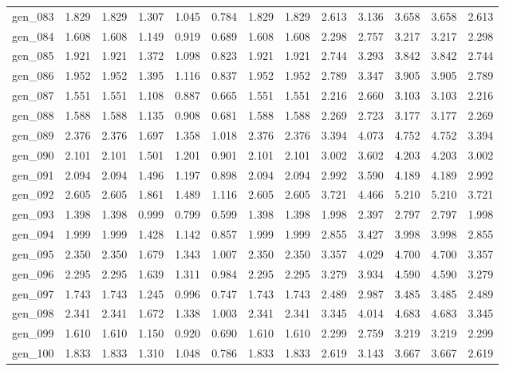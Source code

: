 \begin{tabular}{lrrrrrrrrrrrr}
gen\_083 &  1.829 &  1.829 &  1.307 &  1.045 &  0.784 &  1.829 &  1.829 &  2.613 &  3.136 &  3.658 &  3.658 &  2.613 \\
gen\_084 &  1.608 &  1.608 &  1.149 &  0.919 &  0.689 &  1.608 &  1.608 &  2.298 &  2.757 &  3.217 &  3.217 &  2.298 \\
gen\_085 &  1.921 &  1.921 &  1.372 &  1.098 &  0.823 &  1.921 &  1.921 &  2.744 &  3.293 &  3.842 &  3.842 &  2.744 \\
gen\_086 &  1.952 &  1.952 &  1.395 &  1.116 &  0.837 &  1.952 &  1.952 &  2.789 &  3.347 &  3.905 &  3.905 &  2.789 \\
gen\_087 &  1.551 &  1.551 &  1.108 &  0.887 &  0.665 &  1.551 &  1.551 &  2.216 &  2.660 &  3.103 &  3.103 &  2.216 \\
gen\_088 &  1.588 &  1.588 &  1.135 &  0.908 &  0.681 &  1.588 &  1.588 &  2.269 &  2.723 &  3.177 &  3.177 &  2.269 \\
gen\_089 &  2.376 &  2.376 &  1.697 &  1.358 &  1.018 &  2.376 &  2.376 &  3.394 &  4.073 &  4.752 &  4.752 &  3.394 \\
gen\_090 &  2.101 &  2.101 &  1.501 &  1.201 &  0.901 &  2.101 &  2.101 &  3.002 &  3.602 &  4.203 &  4.203 &  3.002 \\
gen\_091 &  2.094 &  2.094 &  1.496 &  1.197 &  0.898 &  2.094 &  2.094 &  2.992 &  3.590 &  4.189 &  4.189 &  2.992 \\
gen\_092 &  2.605 &  2.605 &  1.861 &  1.489 &  1.116 &  2.605 &  2.605 &  3.721 &  4.466 &  5.210 &  5.210 &  3.721 \\
gen\_093 &  1.398 &  1.398 &  0.999 &  0.799 &  0.599 &  1.398 &  1.398 &  1.998 &  2.397 &  2.797 &  2.797 &  1.998 \\
gen\_094 &  1.999 &  1.999 &  1.428 &  1.142 &  0.857 &  1.999 &  1.999 &  2.855 &  3.427 &  3.998 &  3.998 &  2.855 \\
gen\_095 &  2.350 &  2.350 &  1.679 &  1.343 &  1.007 &  2.350 &  2.350 &  3.357 &  4.029 &  4.700 &  4.700 &  3.357 \\
gen\_096 &  2.295 &  2.295 &  1.639 &  1.311 &  0.984 &  2.295 &  2.295 &  3.279 &  3.934 &  4.590 &  4.590 &  3.279 \\
gen\_097 &  1.743 &  1.743 &  1.245 &  0.996 &  0.747 &  1.743 &  1.743 &  2.489 &  2.987 &  3.485 &  3.485 &  2.489 \\
gen\_098 &  2.341 &  2.341 &  1.672 &  1.338 &  1.003 &  2.341 &  2.341 &  3.345 &  4.014 &  4.683 &  4.683 &  3.345 \\
gen\_099 &  1.610 &  1.610 &  1.150 &  0.920 &  0.690 &  1.610 &  1.610 &  2.299 &  2.759 &  3.219 &  3.219 &  2.299 \\
gen\_100 &  1.833 &  1.833 &  1.310 &  1.048 &  0.786 &  1.833 &  1.833 &  2.619 &  3.143 &  3.667 &  3.667 &  2.619 \\
\bottomrule
\end{tabular}
